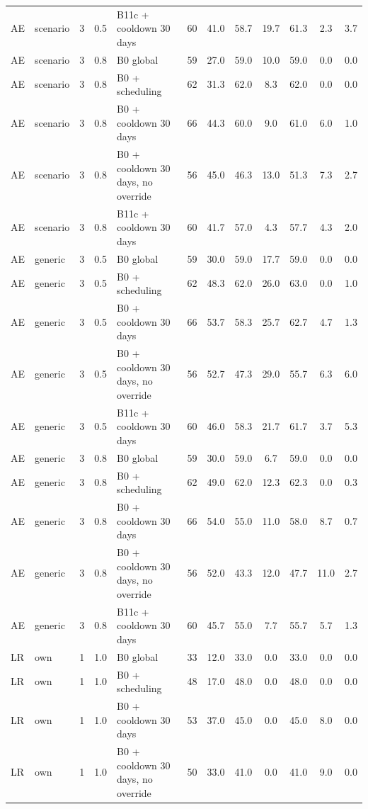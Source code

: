 \begin{longtable}{lllllccccccc}
AE & scenario & 3 & 0.5 & B11c + cooldown 30 days & 60 & 41.0 & 58.7 & 19.7 & 61.3 & 2.3 & 3.7 \\
AE & scenario & 3 & 0.8 & B0 global & 59 & 27.0 & 59.0 & 10.0 & 59.0 & 0.0 & 0.0 \\
AE & scenario & 3 & 0.8 & B0 + scheduling & 62 & 31.3 & 62.0 & 8.3 & 62.0 & 0.0 & 0.0 \\
AE & scenario & 3 & 0.8 & B0 + cooldown 30 days & 66 & 44.3 & 60.0 & 9.0 & 61.0 & 6.0 & 1.0 \\
AE & scenario & 3 & 0.8 & B0 + cooldown 30 days, no override & 56 & 45.0 & 46.3 & 13.0 & 51.3 & 7.3 & 2.7 \\
AE & scenario & 3 & 0.8 & B11c + cooldown 30 days & 60 & 41.7 & 57.0 & 4.3 & 57.7 & 4.3 & 2.0 \\
AE & generic & 3 & 0.5 & B0 global & 59 & 30.0 & 59.0 & 17.7 & 59.0 & 0.0 & 0.0 \\
AE & generic & 3 & 0.5 & B0 + scheduling & 62 & 48.3 & 62.0 & 26.0 & 63.0 & 0.0 & 1.0 \\
AE & generic & 3 & 0.5 & B0 + cooldown 30 days & 66 & 53.7 & 58.3 & 25.7 & 62.7 & 4.7 & 1.3 \\
AE & generic & 3 & 0.5 & B0 + cooldown 30 days, no override & 56 & 52.7 & 47.3 & 29.0 & 55.7 & 6.3 & 6.0 \\
AE & generic & 3 & 0.5 & B11c + cooldown 30 days & 60 & 46.0 & 58.3 & 21.7 & 61.7 & 3.7 & 5.3 \\
AE & generic & 3 & 0.8 & B0 global & 59 & 30.0 & 59.0 & 6.7 & 59.0 & 0.0 & 0.0 \\
AE & generic & 3 & 0.8 & B0 + scheduling & 62 & 49.0 & 62.0 & 12.3 & 62.3 & 0.0 & 0.3 \\
AE & generic & 3 & 0.8 & B0 + cooldown 30 days & 66 & 54.0 & 55.0 & 11.0 & 58.0 & 8.7 & 0.7 \\
AE & generic & 3 & 0.8 & B0 + cooldown 30 days, no override & 56 & 52.0 & 43.3 & 12.0 & 47.7 & 11.0 & 2.7 \\
AE & generic & 3 & 0.8 & B11c + cooldown 30 days & 60 & 45.7 & 55.0 & 7.7 & 55.7 & 5.7 & 1.3 \\
LR & own & 1 & 1.0 & B0 global & 33 & 12.0 & 33.0 & 0.0 & 33.0 & 0.0 & 0.0 \\
LR & own & 1 & 1.0 & B0 + scheduling & 48 & 17.0 & 48.0 & 0.0 & 48.0 & 0.0 & 0.0 \\
LR & own & 1 & 1.0 & B0 + cooldown 30 days & 53 & 37.0 & 45.0 & 0.0 & 45.0 & 8.0 & 0.0 \\
LR & own & 1 & 1.0 & B0 + cooldown 30 days, no override & 50 & 33.0 & 41.0 & 0.0 & 41.0 & 9.0 & 0.0 \\

\end{longtable}
